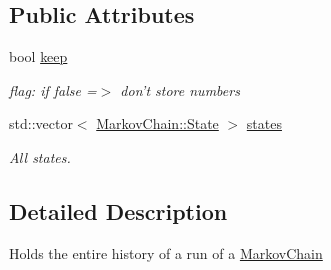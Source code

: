 \subsection*{Public Attributes}
\begin{DoxyCompactItemize}
\item 
bool \hyperlink{structeos_1_1MarkovChain_1_1History_ac6b8c02c837f78b6724fcaa1cb4eaa74}{keep}
\begin{DoxyCompactList}\small\item\em flag: if false =$>$ don't store numbers \item\end{DoxyCompactList}\item 
std::vector$<$ \hyperlink{structeos_1_1MarkovChain_1_1State}{MarkovChain::State} $>$ \hyperlink{structeos_1_1MarkovChain_1_1History_acecd7f35ce23b811f5365bb96446fba8}{states}
\begin{DoxyCompactList}\small\item\em All states. \item\end{DoxyCompactList}\end{DoxyCompactItemize}


\subsection{Detailed Description}
Holds the entire history of a run of a \hyperlink{classeos_1_1MarkovChain}{MarkovChain} 

